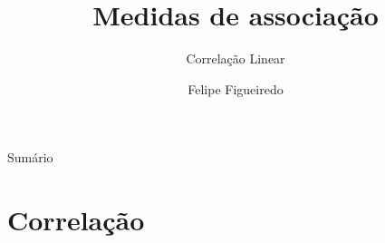 \documentclass{beamer}
\title%
{Medidas de associação}
\subtitle
{Correlação Linear} %
\author%
{Felipe Figueiredo}%
\institute[UNIAN] %
{UNIAN - Centro Universitário Anhanguera de Niterói
}
\date%
{}
\begin{document}
\begin{frame}
  \titlepage
\end{frame}

\begin{frame}{Sumário}
  \tableofcontents
\end{frame}








\section{Correlação}
\end{document}
